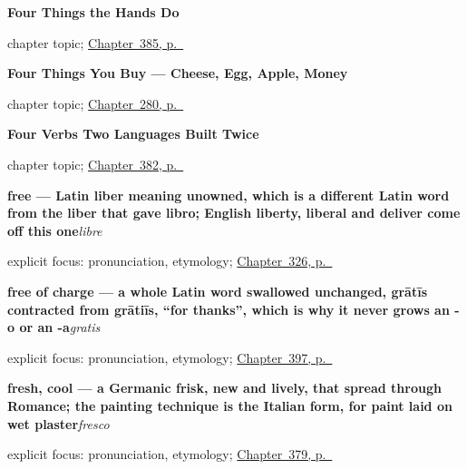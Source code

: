 \noindent\begin{minipage}[t]{\linewidth}
\raggedright
\textbf{Four Things the Hands Do}\par
\footnotesize chapter topic; \hyperref[ch:usar-y-tocar]{Chapter~385, p.~\pageref*{ch:usar-y-tocar}}
\end{minipage}\par\smallskip

\noindent\begin{minipage}[t]{\linewidth}
\raggedright
\textbf{Four Things You Buy --- Cheese, Egg, Apple, Money}\par
\footnotesize chapter topic; \hyperref[ch:la-compra]{Chapter~280, p.~\pageref*{ch:la-compra}}
\end{minipage}\par\smallskip

\noindent\begin{minipage}[t]{\linewidth}
\raggedright
\textbf{Four Verbs Two Languages Built Twice}\par
\footnotesize chapter topic; \hyperref[ch:acabar-y-empezar]{Chapter~382, p.~\pageref*{ch:acabar-y-empezar}}
\end{minipage}\par\smallskip

\noindent\begin{minipage}[t]{\linewidth}
\raggedright
\textbf{free — Latin liber meaning unowned, which is a different Latin word from the liber that gave libro; English liberty, liberal and deliver come off this one}\enspace\emph{libre}\par
\footnotesize explicit focus: pronunciation, etymology; \hyperref[ch:nervioso-y-listo]{Chapter~326, p.~\pageref*{ch:nervioso-y-listo}}
\end{minipage}\par\smallskip

\noindent\begin{minipage}[t]{\linewidth}
\raggedright
\textbf{free of charge — a whole Latin word swallowed unchanged, grātīs contracted from grātiīs, \textquotedblleft{}for thanks\textquotedblright{}, which is why it never grows an -o or an -a}\enspace\emph{gratis}\par
\footnotesize explicit focus: pronunciation, etymology; \hyperref[ch:barato-y-caro]{Chapter~397, p.~\pageref*{ch:barato-y-caro}}
\end{minipage}\par\smallskip

\noindent\begin{minipage}[t]{\linewidth}
\raggedright
\textbf{fresh, cool — a Germanic frisk, new and lively, that spread through Romance; the painting technique is the Italian form, for paint laid on wet plaster}\enspace\emph{fresco}\par
\footnotesize explicit focus: pronunciation, etymology; \hyperref[ch:seco-y-mojado]{Chapter~379, p.~\pageref*{ch:seco-y-mojado}}
\end{minipage}\par\smallskip

